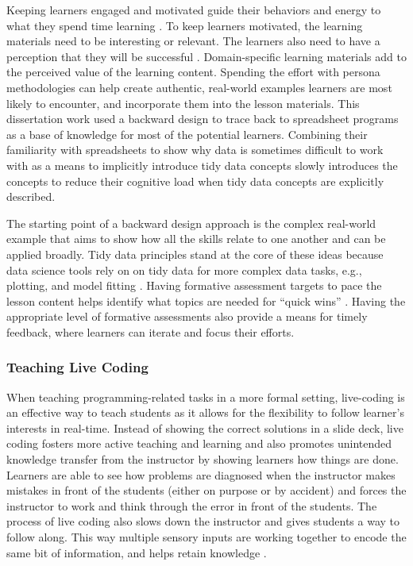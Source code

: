\documentclass[010-intro.tex]{subfiles}
\begin{document}
        Keeping learners engaged and motivated guide their behaviors and energy to what they spend time learning
        \cite{ambrose2010learning}.
        To keep learners motivated, the learning materials need to be interesting or relevant.
        The learners also need to have a perception that they will be successful
        \cite{ambrose2010learning}.
        Domain-specific learning materials add to the perceived value of the learning content.
        Spending the effort with persona methodologies can help create authentic, real-world examples
        learners are most likely to encounter,
        and incorporate them into the lesson materials.
        This dissertation work used a backward design to trace back to spreadsheet programs as a base of knowledge
        for most of the potential learners.
        Combining their familiarity with spreadsheets to show why data is sometimes difficult to work with
        as a means to implicitly introduce tidy data concepts slowly introduces the concepts to reduce their
        cognitive load when tidy data concepts are explicitly described.

        The starting point of a backward design approach is the complex real-world example that
        aims to show how all the skills relate to one another and can be applied broadly.
        Tidy data principles stand at the core of these ideas because data science tools rely on
        on tidy data for more complex data tasks, e.g., plotting, and model fitting
        \cite{wickhamR4ds, wickhamTidyData2014}.
        Having formative assessment targets to pace the lesson content helps identify what topics
        are needed for ``quick wins''
        \cite{Koch2016}.
        Having the appropriate level of formative assessments also provide a means for timely feedback,
        where learners can iterate and focus their efforts.

        \subsubsection{Teaching Live Coding}

        When teaching programming-related tasks in a more formal setting,
        live-coding is an effective way to teach students as it allows for the flexibility to follow learner's interests
        in real-time.
        Instead of showing the correct solutions in a slide deck,
        live coding fosters more active teaching and learning and
        also promotes unintended knowledge transfer from the instructor by showing learners how things are done.
        Learners are able to see how problems are diagnosed when the instructor makes mistakes in front of the students
        (either on purpose or by accident) and forces the instructor to work and think through the error in front of the students.
        The process of live coding also slows down the instructor and gives students a way to follow along.
        This way multiple sensory inputs are working together to encode the same bit of information, and helps retain knowledge
        \cite{wilson2019teaching, hermansProgrammerBrain2021}.
\end{document}
